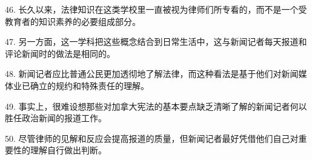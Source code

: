 46. 长久以来，法律知识在这类学校里一直被视为律师们所专看的，而不是一个受教育者的知识素养的必要组成部分。

47. 另一方面，这一学科把这些概念结合到日常生活中，这与新闻记者每天报道和评论新闻时的做法是相同的。

48. 新闻记者应比普通公民更加透彻地了解法律，而这种看法是基于他们对新闻媒体业已确立的规约和特殊责任的理解。

49. 事实上，很难设想那些对加拿大宪法的基本要点缺乏清晰了解的新闻记者何以胜任政治新闻的报道工作。

50. 尽管律师的见解和反应会提高报道的质量，但新闻记者最好凭借他们自己对重要性的理解自行做出判断。